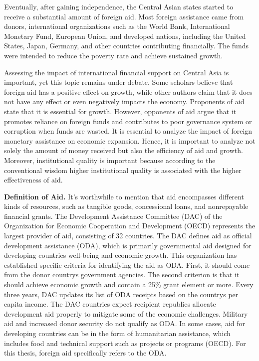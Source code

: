Eventually, after gaining independence, the Central Asian states started
to receive a substantial amount of foreign aid. Most foreign assistance
came from donors, international organizations such as the World Bank,
International Monetary Fund, European Union, and developed nations,
including the United States, Japan, Germany, and other countries
contributing financially. The funds were intended to reduce the poverty
rate and achieve sustained growth.

Assessing the impact of international financial support on Central Asia
is important, yet this topic remains under debate. Some scholars believe
that foreign aid has a positive effect on growth, while other authors
claim that it does not have any effect or even negatively impacts the
economy. Proponents of aid state that it is essential for growth.
However, opponents of aid argue that it promotes reliance on foreign
funds and contributes to poor governance system or corruption when funds
are wasted. It is essential to analyze the impact of foreign monetary
assistance on economic expansion. Hence, it is important to analyze not
solely the amount of money received but also the efficiency of aid and
growth. Moreover, institutional quality is important because according
to the conventional wisdom higher institutional quality is associated
with the higher effectiveness of aid.

{\bfseries Definition of Aid.} It's worthwhile to mention that aid
encompasses different kinds of resources, such as tangible goods,
concessional loans, and nonrepayable financial grants. The Development
Assistance Committee (DAC) of the Organization for Economic Cooperation
and Development (OECD) represents the largest provider of aid,
consisting of 32 countries. The DAC defines aid as official development
assistance (ODA), which is primarily governmental aid designed for
developing countries\textquotesingle{} well-being and economic growth.
This organization has established specific criteria for identifying the
aid as ODA. First, it should come from the donor
country\textquotesingle s government agencies. The second criterion is
that it should achieve economic growth and contain a 25\% grant element
or more. Every three years, DAC updates its list of ODA receipts based
on the country\textquotesingle s per capita income. The DAC countries
expect recipient republics allocate development aid properly to mitigate
some of the economic challenges. Military aid and increased donor
security do not qualify as ODA. In some cases, aid for developing
countries can be in the form of humanitarian assistance, which includes
food and technical support such as projects or programs (OECD). For this
thesis, foreign aid specifically refers to the ODA.

